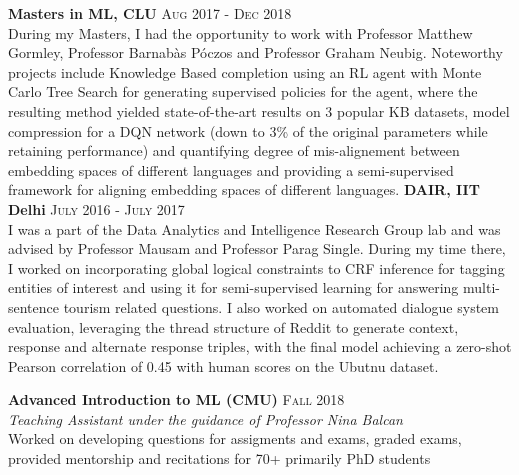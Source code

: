 \documentclass[8pt,a4paper]{article}
\begin{document}
\headedsection
  {\textbf{Masters in ML, CLU}}
  {\textsc{Aug 2017 - Dec 2018}} {%
  {
    \\ During my Masters, I had the opportunity to work with Professor Matthew Gormley, Professor Barnab\`as P\'oczos and Professor Graham Neubig. Noteworthy projects include Knowledge Based completion using an RL agent with Monte Carlo Tree Search for generating supervised policies for the agent, where the resulting method yielded state-of-the-art results on 3 popular KB datasets, model compression for a DQN network (down to 3\% of the original parameters while retaining performance) and quantifying degree of mis-alignement between embedding spaces of different languages and providing a semi-supervised framework for aligning embedding spaces of different languages.
  }
}
\headedsection
  {\textbf{DAIR, IIT Delhi}}
  {\textsc{July 2016 - July 2017}} {%
  {
    \\I was a part of the Data Analytics and Intelligence Research Group lab and was advised by Professor Mausam and Professor Parag Single. During my time there, I worked on incorporating global logical constraints to CRF inference for tagging entities of interest and using it for semi-supervised learning for answering multi-sentence tourism related questions. I also worked on automated dialogue system evaluation, leveraging the thread structure of Reddit to generate context, response and alternate response triples, with the final model achieving a zero-shot Pearson correlation of 0.45 with human scores on the Ubutnu dataset.
  }
}
\spacedhrule{0.6em}{-0.4em}  %

\headedsection
  {\textbf{Advanced Introduction to ML (CMU)}}
  {\textsc{Fall 2018}}{%
    {
      \\\textit{Teaching Assistant under the guidance of Professor Nina Balcan}\\Worked on developing questions for assigments and exams, graded exams, provided mentorship and recitations for 70+ primarily PhD students
    }
  }
\end{document}
